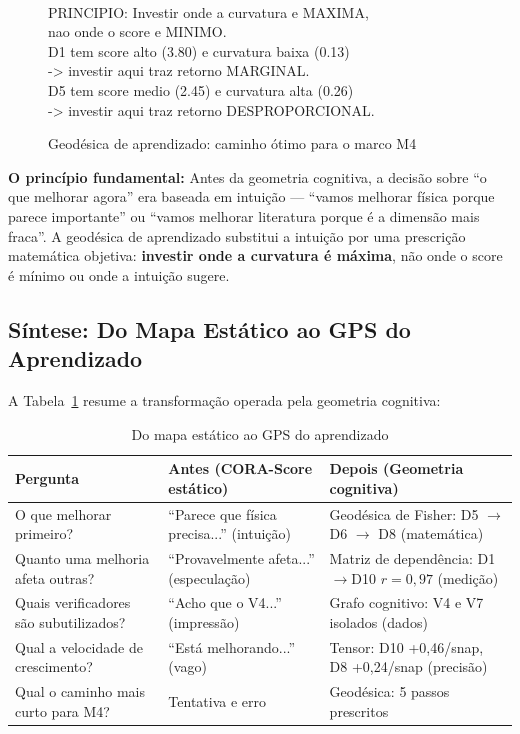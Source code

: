 \begin{figure}[H]
{\begin{minipage}{0.85\textwidth}
\\
PRINCIPIO: Investir onde a curvatura e MAXIMA,\\
nao onde o score e MINIMO.\\
D1 tem score alto (3.80) e curvatura baixa (0.13)\\
-> investir aqui traz retorno MARGINAL.\\
D5 tem score medio (2.45) e curvatura alta (0.26)\\
-> investir aqui traz retorno DESPROPORCIONAL.\\
\end{minipage}}
\caption{Geodésica de aprendizado: caminho ótimo para o marco M4}
\end{figure}

\textbf{O princípio fundamental:} Antes da geometria cognitiva, a decisão
sobre ``o que melhorar agora'' era baseada em intuição --- ``vamos melhorar
física porque parece importante'' ou ``vamos melhorar literatura porque é
a dimensão mais fraca''. A geodésica de aprendizado substitui a intuição
por uma prescrição matemática objetiva: \textbf{investir onde a curvatura
é máxima}, não onde o score é mínimo ou onde a intuição sugere.

\subsection{Síntese: Do Mapa Estático ao GPS do Aprendizado}

A Tabela~\ref{tab:gps} resume a transformação operada pela geometria cognitiva:

\begin{table}[H]\centering
\caption{Do mapa estático ao GPS do aprendizado}
\label{tab:gps}
\begin{tabular}{p{}p{}p{}}
\toprule
\textbf{Pergunta} & \textbf{Antes (CORA-Score estático)} & \textbf{Depois (Geometria cognitiva)} \\
\midrule
O que melhorar primeiro? & ``Parece que física precisa...'' (intuição) & Geodésica de Fisher: D5 $\to$ D6 $\to$ D8 (matemática) \\
Quanto uma melhoria afeta outras? & ``Provavelmente afeta...'' (especulação) & Matriz de dependência: D1$\to$D10 $r=0,97$ (medição) \\
Quais verificadores são subutilizados? & ``Acho que o V4...'' (impressão) & Grafo cognitivo: V4 e V7 isolados (dados) \\
Qual a velocidade de crescimento? & ``Está melhorando...'' (vago) & Tensor: D10 +0,46/snap, D8 +0,24/snap (precisão) \\
Qual o caminho mais curto para M4? & Tentativa e erro & Geodésica: 5 passos prescritos \\
\bottomrule
\end{tabular}
\end{table}

